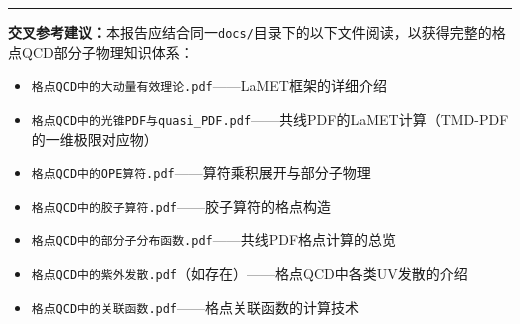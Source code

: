 \documentclass[12pt,a4paper]{ctexart}
\theoremstyle{definition}
\begin{document}
\vspace{1cm}
\noindent\rule{\textwidth}{0.5pt}
\small
\textbf{交叉参考建议：}本报告应结合同一\texttt{docs/}目录下的以下文件阅读，以获得完整的格点QCD部分子物理知识体系：
\begin{itemize}
    \item \texttt{格点QCD中的大动量有效理论.pdf}——LaMET框架的详细介绍
    \item \texttt{格点QCD中的光锥PDF与quasi\_PDF.pdf}——共线PDF的LaMET计算（TMD-PDF的一维极限对应物）
    \item \texttt{格点QCD中的OPE算符.pdf}——算符乘积展开与部分子物理
    \item \texttt{格点QCD中的胶子算符.pdf}——胶子算符的格点构造
    \item \texttt{格点QCD中的部分子分布函数.pdf}——共线PDF格点计算的总览
    \item \texttt{格点QCD中的紫外发散.pdf}（如存在）——格点QCD中各类UV发散的介绍
    \item \texttt{格点QCD中的关联函数.pdf}——格点关联函数的计算技术
\end{itemize}
\end{document}
